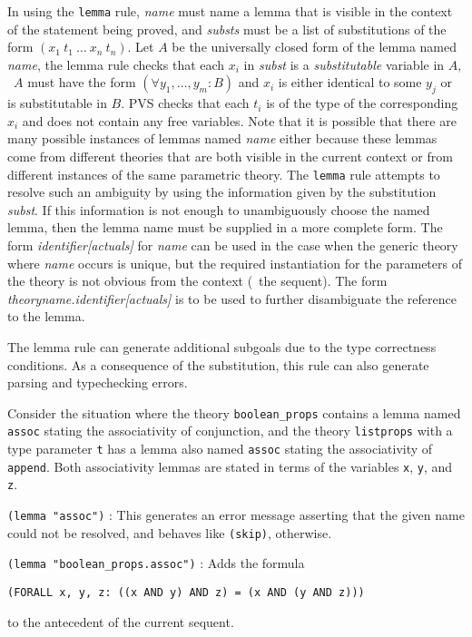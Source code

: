 \documentclass[12pt,twoside]{book}
\makeatletter
\newcommand{\indtt}[1]{\texttt{#1}\index{#1@{\texttt{#1}}}}  %
\newenvironment{usage}[1]{\item[usage:\hspace*{-0.175in}]#1\begin{description}\setlength{\itemindent}{-0.2in}\setlength{\itemsep}{0.1in}}{\end{description}}
\makeatother
\begin{document}
\begin{description}
In using the \indtt{lemma} rule, \emph{name} must name a lemma that is
visible in the context of the statement being proved, and \emph{substs}
must be a list of substitutions of the form $(x_1\ t_1\ \ldots\ x_n\
t_n)$.  Let $A$ be the universally closed form of the lemma named \emph{name}, the lemma rule checks that each $x_i$ in \emph{subst} is a
\emph{substitutable} variable in $A$, \ie\ $A$ must have the form
$(\forall y_1,\ldots, y_m : B)$ and $x_i$ is either identical to some
$y_j$ or is substitutable in $B$.  PVS checks that each $t_i$ is
of the type of the corresponding $x_i$ and does not contain any free
variables.  Note that it is possible that there are many possible
instances of lemmas named \emph{name} either because these lemmas come
from different theories that are both visible in the current context or
from different instances of the same parametric theory.  The \indtt{lemma}
rule attempts to resolve such an ambiguity by using the information
given by the substitution \emph{subst}.  If this information is not
enough to unambiguously choose the named lemma, then the lemma name must
be supplied in a more complete form.  The form \emph{identifier[actuals]} for \emph{name} can be used in the case when the
generic theory where  \emph{name} occurs is unique, but the required
instantiation for the parameters of the theory is not obvious from the
context (\ie\ the sequent).  The
form \emph{theoryname.identifier[actuals]} is to be used to further
disambiguate the reference to the lemma.

The lemma rule can generate additional subgoals due to the type
correctness conditions.  As a consequence of the substitution,
this rule can also generate parsing and typechecking errors.

\begin{usage}
{\hspace*{0.2in}Consider the situation where the theory
\texttt{boolean\_props} contains a lemma named \texttt{assoc} stating the
associativity of conjunction, and the theory \texttt{listprops} with a
type parameter \texttt{t} has a lemma also named \texttt{assoc} stating
the associativity of \texttt{append}.  Both associativity lemmas are
stated in terms of the variables \texttt{x}, \texttt{y}, and \texttt{z}.}

\item[\texttt{(lemma "assoc")}] : This generates an error message asserting
that the given name could not be resolved, and behaves like \texttt{(skip)}, otherwise.

\item[\texttt{(lemma "boolean\_props.assoc")}] : Adds the formula
\begin{center}
\texttt{(FORALL x, y, z:\ ((x AND y) AND z) = (x AND (y AND z)))}
\end{center}
to the antecedent of the current sequent.


\end{usage}
\end{description}
\end{document}
